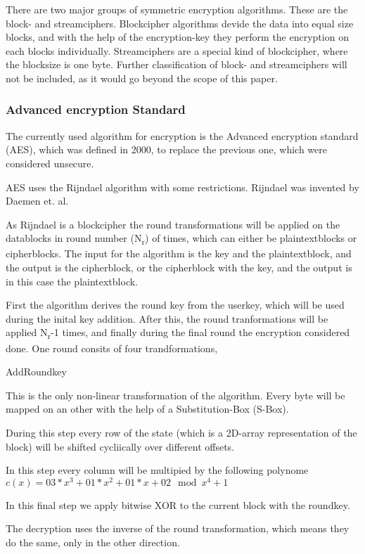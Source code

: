 \documentclass[12pt,a4paper,titlepage,oneside]{scrartcl}
\begin{document}
There are two major groups of symmetric encryption algorithms.
These are the block- and streamciphers.
Blockcipher algorithms devide the data into equal size blocks, and with the help of the encryption-key they perform the encryption on each blocks individually.
Streamciphers are a special kind of blockcipher, where the blocksize is one byte. \cite{menezes1996handbook}
Further classification of block- and streamciphers will not be included, as it would go beyond the scope of this paper.

\subsubsection{Advanced encryption Standard}
The currently used algorithm for encryption is the Advanced encryption standard (AES), which was defined in 2000, to replace the previous one, which were considered unsecure.

AES uses the Rijndael algorithm with some restrictions.
Rijndael was invented by Daemen et. al. \cite{daemen2013design}

As Rijndael is a blockcipher the round transformations will be applied on the datablocks in round number (N\textsubscript{r}) of times, which can either be plaintextblocks or cipherblocks.
The input for the algorithm is the key and the plaintextblock, and the output is the cipherblock, or the cipherblock with the key, and the output is in this case the plaintextblock. \cite{daemen2013design}

First the algorithm derives the round key from the userkey, which will be used during the inital key addition.
After this, the round tranformations will be applied N\textsubscript{r}-1 times, and finally during the final round the encryption considered done.
One round consits of four trandformations,
\begin{labeling}{AddRoundkey}
\item [SubBytes] This is the only non-linear transformation of the algorithm. Every byte will be mapped on an other with the help of a Substitution-Box (S-Box).
\item [ShiftRows] During this step every row of the state (which is a 2D-array representation of the block) will be shifted cycliically over different offsets.
\item [MixColumns] In this step every column will be multipied by the following polynome \begin{math} c(x) = 03 * x^3 + 01 * x^2 + 01 * x + 02 \mod x^4 + 1 \end{math}
\item [AddRoundkey] In this final step we apply bitwise XOR to the current block with the roundkey.
\end{labeling}
The decryption uses the inverse of the round transformation, which means they do the same, only in the other direction. \cite{daemen2013design}
\end{document}
